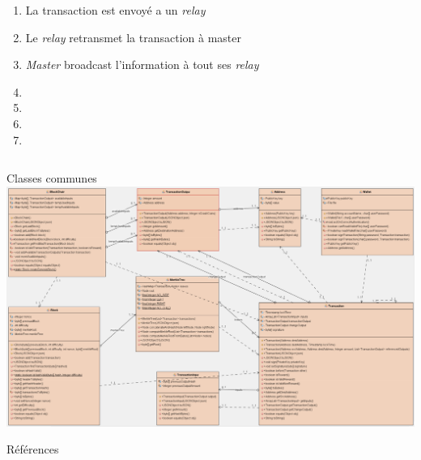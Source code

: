 \documentclass{beamer}
\begin{document}
\begin{frame}
\begin{columns}
\begin{column}{.5\textwidth}
\begin{enumerate}
            \item La transaction est envoyé a un \textit{relay}
            \item Le \textit{relay} retransmet la transaction à master
            \item \textit{Master} broadcast l'information à tout ses \textit{relay}
            \item 
            \item 
            \item 
            \item 
		\end{enumerate}
      \end{column}
    \end{columns}
\end{frame}

\begin{frame}{Classes communes}
    \includegraphics[width=\textwidth]{common-uml.png}
\end{frame}

\begin{frame}{Références}

    {\footnotesize
    	
		
    }
\end{frame}
\end{document}
